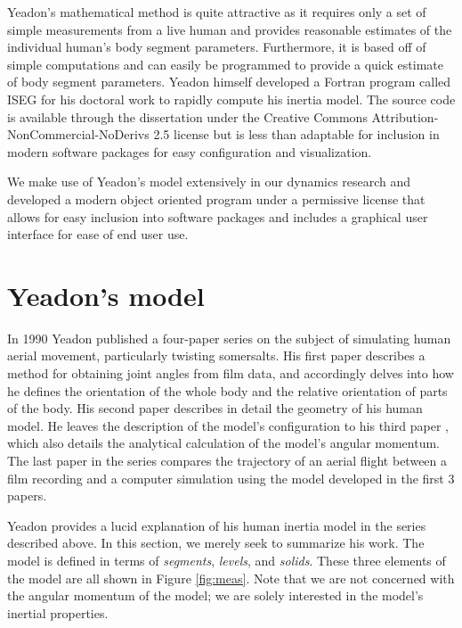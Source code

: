 \documentclass[10pt]{article}
\begin{document}
Yeadon's mathematical method is quite attractive as it requires only a set of
simple measurements from a live human and provides reasonable estimates of the
individual human's body segment parameters. Furthermore, it is based off of
simple computations and can easily be programmed to provide a quick estimate of
body segment parameters. Yeadon himself developed a Fortran program called ISEG
for his doctoral work \cite{Yeadon1984a} to rapidly compute his inertia model.
The source code is available through the dissertation under the Creative
Commons Attribution-NonCommercial-NoDerivs 2.5 license but is less than
adaptable for inclusion in modern software packages for easy configuration and
visualization.

We make use of Yeadon's model extensively in our dynamics research and
developed a modern object oriented program under a permissive license that
allows for easy inclusion into software packages and includes a graphical user
interface for ease of end user use.

\section*{Yeadon's model}

In 1990 Yeadon published a four-paper series on the subject of simulating
human aerial movement, particularly twisting somersalts. His first paper
\cite{Yeadon1990c} describes a method for obtaining joint angles from film
data, and accordingly delves into how he defines the orientation of the whole
body and the relative orientation of parts of the body. His second paper
\cite{Yeadon1990f} describes in detail the geometry of his human model. He
leaves the description of the model's configuration to his third paper
\cite{Yeadon1990e}, which also details the analytical calculation of the
model's angular momentum. The last paper in the series \cite{Yeadon1990d}
compares the trajectory of an aerial flight between a film recording and a
computer simulation using the model developed in the first 3 papers.

Yeadon provides a lucid explanation of his human inertia model in
the series described above. In this section, we merely seek to summarize his
work.  The model is defined in terms of \emph{segments}, \emph{levels}, and
\emph{solids}.  These three elements of the model are all shown in Figure
\ref{fig:meas}. Note that we are not concerned with the angular momentum of the
model; we are solely interested in the model's inertial properties.
\end{document}
